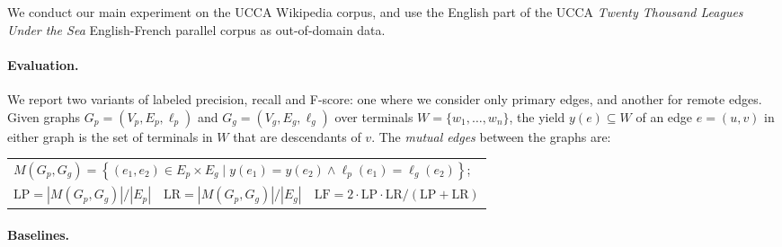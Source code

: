 \documentclass[a0,portrait]{a0poster}
\begin{document}
\begin{multicols}{2}
We conduct our main experiment on the UCCA Wikipedia corpus,
and use the English part of the UCCA \textit{Twenty Thousand Leagues Under the Sea}
English-French parallel corpus as out-of-domain data.

\paragraph{Evaluation.}
We report two variants of labeled precision, recall and F-score:
one where we consider only primary edges, and another for remote edges.
Given graphs $G_p=(V_p,E_p,\ell_p)$ and $G_g=(V_g,E_g,\ell_g)$
over terminals $W = \{w_1,\ldots,w_n\}$,
the yield $y(e) \subseteq W$ of an edge $e=(u,v)$ in either graph
is the set of terminals in $W$ that are descendants of $v$.
The \textit{mutual edges} between the graphs are:
\begin{flushleft}
\begin{tabular}{lcr}
	\multicolumn{3}{l}{$M(G_p,G_g) =
    \left\{(e_1,e_2) \in E_p \times E_g \;|\;
    y(e_1) = y(e_2) \wedge \ell_p(e_1)=\ell_g(e_2)\right\}$;} \vspace{5mm} \\
	$\text{LP} = |M(G_p,G_g)| / |E_p|$ \hspace{2cm} &
	$\text{LR} = |M(G_p,G_g)| / |E_g|$ \hspace{2cm} &
	$\text{LF} = 2 \cdot \text{LP} \cdot \text{LR} / (\text{LP} + \text{LR})$
\end{tabular}
\end{flushleft}

\paragraph{Baselines.}


\end{multicols}
\end{document}
